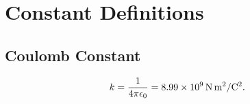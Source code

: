 \section{Constant Definitions}

\subsection{Coulomb Constant}\label{sec:coulombconstantdef}
\begin{equation*}
  k = \frac{1}{4 \pi \epsilon_0} = \qty{8,99e9}{\N.\m^2\per\C^2}  
.\end{equation*}

\begin{symbols}
\end{symbols}


